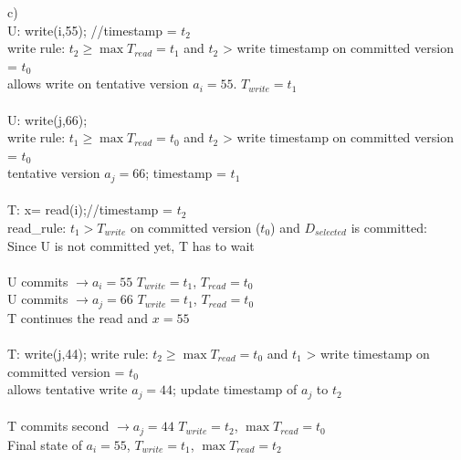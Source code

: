 \documentclass{article}
\begin{document}
    \begin{enumerate}c)\\
        U: write(i,55); //timestamp = $t_2$\\
        write rule: $t_2 \geq \max T_{read} = t_1$ and $t_2$ > write timestamp on committed version = $t_0$\\
        allows write on tentative version $a_i = 55$. $T_{write} = t_1$\\
        \\
        U: write(j,66);\\
        write rule: $t_1 \geq \max T_{read} = t_0$ and $t_2$ > write timestamp on committed version = $t_0$\\
        tentative version $a_j = 66$; timestamp = $t_1$\\
        \\
        T: x= read(i);//timestamp = $t_2$\\
        read_rule: $t_1 > T_{write}$ on committed version ($t_0$) and $D_{selected}$ is committed:\\
        Since U is not committed yet, T has to wait\\
        \\
        U commits $\rightarrow a_i = 55$ $T_{write} = t_1$, $T_{read} = t_0$\\
        U commits $\rightarrow a_j = 66$ $T_{write} = t_1$, $T_{read} = t_0$\\
        T continues the read and $x = 55$\\
        \\
        T: write(j,44);
        write rule: $t_2 \geq \max T_{read} = t_0$ and $t_1$ > write timestamp on committed version = $t_0$\\
        allows tentative write $a_j = 44$; update timestamp of $a_j$ to $t_2$\\
        \\
        T commits second $\rightarrow a_j = 44$ $T_{write} = t_2$, $\max T_{read} = t_0$\\
        Final state of $a_i = 55$, $T_{write} = t_1$, $\max T_{read} = t_2$\\
    \end{enumerate}
\end{document}
